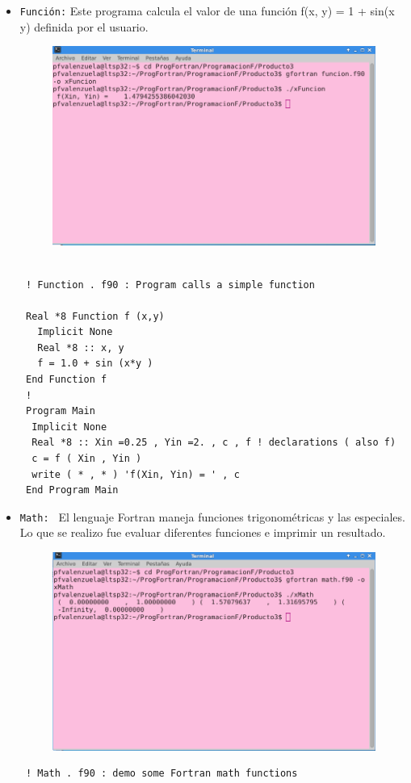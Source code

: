\documentclass[12pt]{article}
\begin{document}
\begin{itemize}
\item {\tt Función:}
Este programa calcula el valor de una función f(x, y) = 1 + sin(x y) definida por el usuario.
\begin{figure}[h]
\centering
\includegraphics[scale=0.5]{funcion.png}
\end{figure}
\begin{verbatim}
 
 ! Function . f90 : Program calls a simple function

 Real *8 Function f (x,y)
   Implicit None
   Real *8 :: x, y
   f = 1.0 + sin (x*y )
 End Function f
 !
 Program Main
  Implicit None 
  Real *8 :: Xin =0.25 , Yin =2. , c , f ! declarations ( also f)
  c = f ( Xin , Yin )
  write ( * , * ) 'f(Xin, Yin) = ' , c
 End Program Main 
 \end{verbatim}
 
\item {\tt Math: } 
 El lenguaje Fortran maneja funciones trigonométricas y las especiales. Lo que se realizo fue evaluar diferentes funciones e imprimir un resultado.
\begin{figure}[h]
\centering
\includegraphics[scale=0.5]{math.png}
\end{figure}
\begin{verbatim}
 ! Math . f90 : demo some Fortran math functions
 

\end{verbatim}
\end{itemize}
\end{document}
